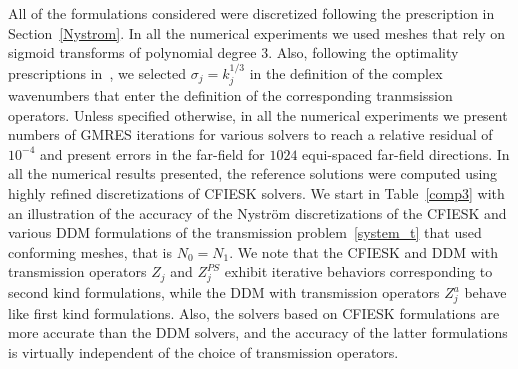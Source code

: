 \documentclass[11pt]{article}
\numberwithin{equation}{section}
\begin{document}
 All of the formulations considered were discretized following the prescription in Section~\ref{Nystrom}. In all the numerical experiments we used meshes that rely on sigmoid transforms of polynomial degree 3. Also,  following the optimality prescriptions in~\cite{boubendirDDM}, we selected $\sigma_j=k_j^{1/3}$ in the definition of the complex wavenumbers that enter the definition of the corresponding tranmsission operators. Unless specified otherwise, in all the numerical experiments we present numbers of GMRES iterations for various solvers to reach a relative residual of $10^{-4}$ and present errors in the far-field for $1024$ equi-spaced far-field directions. In all the numerical results presented, the reference solutions were computed using highly refined discretizations of CFIESK solvers. We start in Table~\ref{comp3} with an illustration of the accuracy of the Nystr\"om discretizations of the CFIESK and various DDM formulations of the transmission problem~\eqref{system_t} that used conforming meshes, that is $N_0=N_1$. We note that the CFIESK and DDM with transmission operators $Z_j$ and $Z_j^{PS}$ exhibit iterative behaviors corresponding to second kind formulations, while the DDM with transmission operators $Z_j^a$ behave like first kind formulations. Also, the solvers based on CFIESK formulations are more accurate than the DDM solvers, and the accuracy of the latter formulations is virtually independent of the choice of transmission operators. 
\end{document}
